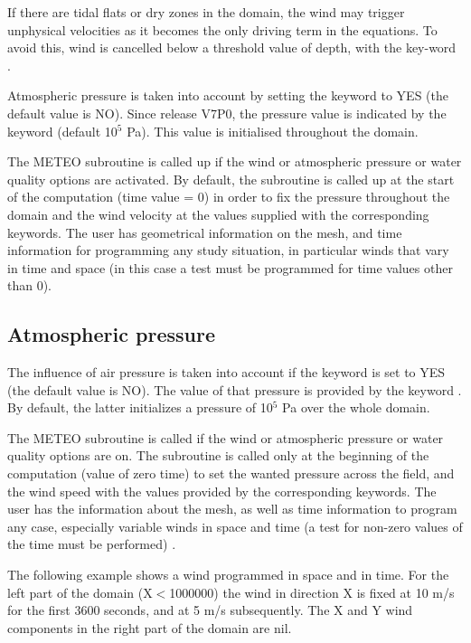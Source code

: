  If there are tidal flats or dry zones in the domain, the wind may trigger unphysical velocities as it becomes the only driving term in the equations. To avoid this, wind is cancelled below a threshold value of depth, with the key-word .

 Atmospheric pressure is taken into account by setting the keyword  to YES (the default value is NO). Since release V7P0, the pressure value is indicated by the keyword  (default 10${}^{5}$ Pa). This value is initialised throughout the domain.

 The METEO subroutine is called up if the wind or atmospheric pressure or water quality options are activated. By default, the subroutine is called up at the start of the computation (time value = 0) in order to fix the pressure throughout the domain and the wind velocity at the values supplied with the corresponding keywords. The user has geometrical information on the mesh, and time information for programming any study situation, in particular winds that vary in time and space (in this case a test must be programmed for time values other than 0).


\subsection{ Atmospheric pressure}

 The influence of air pressure is taken into account if the keyword  is set to YES (the default value is NO). The value of that pressure is provided by the keyword . By default, the latter initializes a pressure of 10${}^{5}$ Pa over the whole domain.

 The METEO subroutine is called if the wind or atmospheric pressure or water quality options are on. The subroutine is called only at the beginning of the computation (value of zero time) to set the wanted pressure across the field, and the wind speed with the values {}{}provided by the corresponding keywords. The user has the information about the mesh, as well as time information to program any case, especially variable winds in space and time (a test for non-zero values {}{}of the time must be performed) .

 The following example shows a wind programmed in space and in time. For the left part of the domain (X$<$1000000) the wind in direction X is fixed at 10 m/s for the first 3600 seconds, and at 5 m/s subsequently. The X and Y wind components in the right part of the domain are nil.

